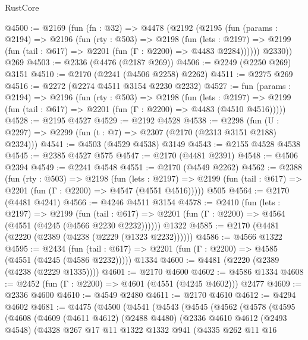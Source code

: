 \begin{lexlean}{RustCore}
\begin{coremodule}
@4500 := @2169
    (fun (fn : @32) =>
    @4478
      (@2192
        (@2195
          (fun (params : @2194) =>
          @2196
            (fun (rty : @503) =>
            @2198
              (fun (lets : @2197) =>
              @2199 (fun (tail : @617) => @2201 (fun (Γ : @2200) => @4483 @2284))))))
        @2330))
    @269
@4503 := @2336 (@4476 (@2187 @269))
@4506 := @2249 (@2250 @269) @3151
@4510 := @2170 (@2241 (@4506 @2258) @2262)
@4511 := @2275 @269
@4516 := @2272 (@2274 @4511 @3154 @2230 @2232)
@4527 := fun (params : @2194) =>
  @2196
    (fun (rty : @503) =>
    @2198
      (fun (lets : @2197) =>
      @2199 (fun (tail : @617) => @2201 (fun (Γ : @2200) => @4483 (@4510 @4516)))))
@4528 := @2195 @4527
@4529 := @2192 @4528
@4538 := @2298 (fun (U : @2297) => @2299 (fun (t : @7) => @2307 (@2170 (@2313 @3151 @2188) @2324)))
@4541 := @4503 (@4529 @4538) @3149
@4543 := @2155 @4528 @4538
@4545 := @2385 @4527 @575
@4547 := @2170 (@4481 @2391)
@4548 := @4506 @2394
@4549 := @2241 @4548
@4551 := @2170 (@4549 @2262)
@4562 := @2388
    (fun (rty : @503) =>
    @2198
      (fun (lets : @2197) =>
      @2199 (fun (tail : @617) => @2201 (fun (Γ : @2200) => @4547 (@4551 @4516)))))
    @505
@4564 := @2170 (@4481 @4241)
@4566 := @4246 @4511 @3154
@4578 := @2410
    (fun (lets : @2197) =>
    @2199
      (fun (tail : @617) => @2201 (fun (Γ : @2200) => @4564 (@4551 (@4245 (@4566 @2230 @2232))))))
    @1322
@4585 := @2170 (@4481 (@2220 (@2389 (@4238 (@2229 (@1323 @2232))))))
@4586 := @4566 @1322
@4595 := @2434
    (fun (tail : @617) => @2201 (fun (Γ : @2200) => @4585 (@4551 (@4245 (@4586 @2232)))))
    @1334
@4600 := @4481 (@2220 (@2389 (@4238 (@2229 @1335))))
@4601 := @2170 @4600
@4602 := @4586 @1334
@4608 := @2452 (fun (Γ : @2200) => @4601 (@4551 (@4245 @4602))) @2477
@4609 := @2336 @4600
@4610 := @4549 @2480
@4611 := @2170 @4610
@4612 := @4294 @4602
@4681 := @4475
    (@4500
      (@4541
        (@4543
          (@4545
            (@4562
              (@4578
                (@4595
                  (@4608
                    (@4609
                      (@4611 @4612)
                      (@2488 @4480)
                      (@2336
                        @4610
                        @4612
                        (@2493 @4548)
                        (@4328
                          @267
                          @17
                          @11
                          @1322
                          @1332
                          @941
                          (@4335
                            @262
                            @11
                            @16

\end{coremodule}
\end{lexlean}

